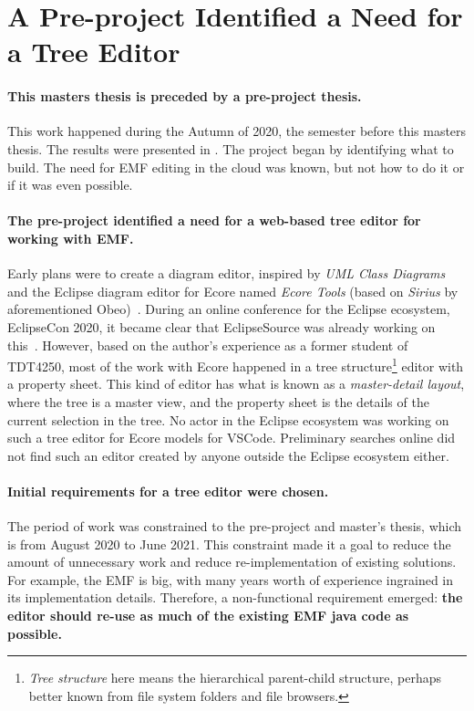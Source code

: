 \section{A Pre-project Identified a Need for a Tree Editor}

\paragraph{This masters thesis is preceded by a pre-project thesis.}
This work happened during the Autumn of 2020, the semester before this masters thesis.
The results were presented in \cite{rekstadModelingEnvironmentCloud2020}.
The project began by identifying what to build.
The need for \acrshort{EMF} editing in the \gls{cloud} was known, but not how to do it or if it was even possible.

\paragraph{The pre-project identified a need for a web-based tree editor for working with \acrshort{EMF}.}
Early plans were to create a diagram editor, inspired by \textit{\gls{UML} Class Diagrams} and the \gls{Eclipse} diagram editor for \gls{Ecore} named \textit{Ecore Tools} (based on \textit{Sirius} by aforementioned Obeo)~\cite{rekstadModelingEnvironmentCloud2020}.
During an online conference for the Eclipse ecosystem, EclipseCon 2020, it became clear that EclipseSource was already working on this~\cite{jonashelmingEcoreToolsCloud2020}.
However, based on the author's experience as a former student of \gls{TDT4250}, most of the work with \gls{Ecore} happened in a tree structure\footnote{\textit{Tree structure} here means the hierarchical parent-child structure, perhaps better known from file system folders and file browsers.} editor with a property sheet.
This kind of editor has what is known as a \textit{master-detail layout}, where the tree is a master view, and the property sheet is the details of the current selection in the tree.
No actor in the Eclipse ecosystem was working on such a tree editor for \gls{Ecore} models for \gls{VSCode}.
Preliminary searches online did not find such an editor created by anyone outside the Eclipse ecosystem either.


\paragraph{Initial requirements for a tree editor were chosen.}
The period of work was constrained to the pre-project and master's thesis, which is from August 2020 to June 2021.
This constraint made it a goal to reduce the amount of unnecessary work and reduce re-implementation of existing solutions.
For example, the \acrlong{EMF} is big, with many years worth of experience ingrained in its implementation details.
Therefore, a non-functional requirement emerged: \textbf{the editor should re-use as much of the existing \acrshort{EMF} java code as possible.}


